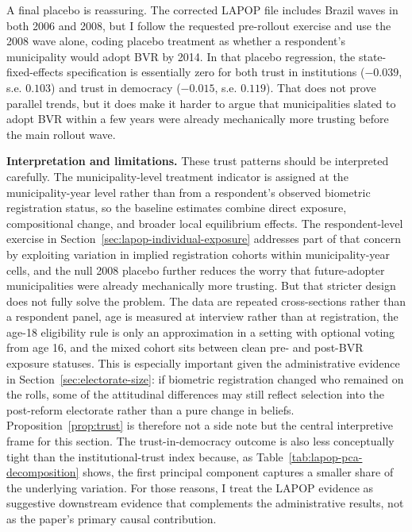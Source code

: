 A final placebo is reassuring. The corrected LAPOP file includes Brazil waves in both 2006 and 2008, but I follow the requested pre-rollout exercise and use the 2008 wave alone, coding placebo treatment as whether a respondent's municipality would adopt BVR by 2014. In that placebo regression, the state-fixed-effects specification is essentially zero for both trust in institutions ($-0.039$, s.e. $0.103$) and trust in democracy ($-0.015$, s.e. $0.119$). That does not prove parallel trends, but it does make it harder to argue that municipalities slated to adopt BVR within a few years were already mechanically more trusting before the main rollout wave.

\textbf{Interpretation and limitations.} These trust patterns should be interpreted carefully. The municipality-level treatment indicator is assigned at the municipality-year level rather than from a respondent's observed biometric registration status, so the baseline estimates combine direct exposure, compositional change, and broader local equilibrium effects. The respondent-level exercise in Section~\ref{sec:lapop-individual-exposure} addresses part of that concern by exploiting variation in implied registration cohorts within municipality-year cells, and the null 2008 placebo further reduces the worry that future-adopter municipalities were already mechanically more trusting. But that stricter design does not fully solve the problem. The data are repeated cross-sections rather than a respondent panel, age is measured at interview rather than at registration, the age-18 eligibility rule is only an approximation in a setting with optional voting from age 16, and the mixed cohort sits between clean pre- and post-BVR exposure statuses. This is especially important given the administrative evidence in Section~\ref{sec:electorate-size}: if biometric registration changed who remained on the rolls, some of the attitudinal differences may still reflect selection into the post-reform electorate rather than a pure change in beliefs. Proposition~\ref{prop:trust} is therefore not a side note but the central interpretive frame for this section. The trust-in-democracy outcome is also less conceptually tight than the institutional-trust index because, as Table~\ref{tab:lapop-pca-decomposition} shows, the first principal component captures a smaller share of the underlying variation. For those reasons, I treat the LAPOP evidence as suggestive downstream evidence that complements the administrative results, not as the paper's primary causal contribution.

